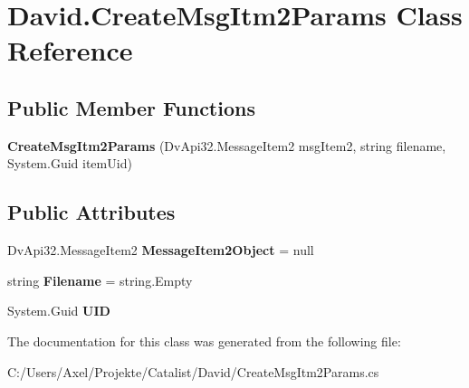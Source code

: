 \hypertarget{class_david_1_1_create_msg_itm2_params}{}\section{David.\+Create\+Msg\+Itm2\+Params Class Reference}
\label{class_david_1_1_create_msg_itm2_params}
\subsection*{Public Member Functions}
\begin{DoxyCompactItemize}
\item 
{\bfseries Create\+Msg\+Itm2\+Params} (Dv\+Api32.\+Message\+Item2 msg\+Item2, string filename, System.\+Guid item\+Uid)\hypertarget{class_david_1_1_create_msg_itm2_params_a248506c6ba2511abf68baef5e4cb0f56}{}\label{class_david_1_1_create_msg_itm2_params_a248506c6ba2511abf68baef5e4cb0f56}

\end{DoxyCompactItemize}
\subsection*{Public Attributes}
\begin{DoxyCompactItemize}
\item 
Dv\+Api32.\+Message\+Item2 {\bfseries Message\+Item2\+Object} = null\hypertarget{class_david_1_1_create_msg_itm2_params_a71693919be91c395536915b634ad577e}{}\label{class_david_1_1_create_msg_itm2_params_a71693919be91c395536915b634ad577e}

\item 
string {\bfseries Filename} = string.\+Empty\hypertarget{class_david_1_1_create_msg_itm2_params_a10aee6f6d4056b96cb25246b3aa287b4}{}\label{class_david_1_1_create_msg_itm2_params_a10aee6f6d4056b96cb25246b3aa287b4}

\item 
System.\+Guid {\bfseries U\+ID}\hypertarget{class_david_1_1_create_msg_itm2_params_ace1294202a538294b9370bdcde43f15f}{}\label{class_david_1_1_create_msg_itm2_params_ace1294202a538294b9370bdcde43f15f}

\end{DoxyCompactItemize}


The documentation for this class was generated from the following file\+:\begin{DoxyCompactItemize}
\item 
C\+:/\+Users/\+Axel/\+Projekte/\+Catalist/\+David/Create\+Msg\+Itm2\+Params.\+cs\end{DoxyCompactItemize}
